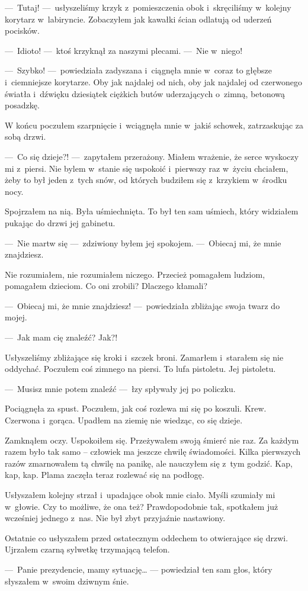 ---~Tutaj! ---~usłyszeliśmy krzyk z~pomieszczenia obok i~skręciliśmy w~kolejny korytarz w~labiryncie. Zobaczyłem jak 
kawałki ścian odlatują od uderzeń pocisków. 

---~Idioto! ---~ktoś krzyknął za naszymi plecami. ---~Nie w~niego!

---~Szybko! ---~powiedziała zadyszana i~ciągnęła mnie w~coraz to głębsze i~ciemniejsze korytarze. Oby jak najdalej od 
nich, oby jak najdalej od czerwonego światła i~dźwięku dziesiątek ciężkich butów uderzających o~zimną, betonową 
posadzkę.

W końcu poczułem szarpnięcie i~wciągnęła mnie w~jakiś schowek, zatrzaskując za sobą drzwi. 

---~Co się dzieje?! ---~zapytałem przerażony. Miałem wrażenie, że serce wyskoczy mi z~piersi. Nie bylem w~stanie się 
uspokoić i~pierwszy raz w~życiu chciałem, żeby to był jeden z~tych snów, od których budziłem się z~krzykiem w~środku 
nocy. 

Spojrzałem na nią. Była uśmiechnięta. To był ten sam uśmiech, który widziałem pukając do drzwi jej gabinetu. 

---~Nie martw się ---~zdziwiony byłem jej spokojem. ---~Obiecaj mi, że mnie znajdziesz. 

Nie rozumiałem, nie rozumiałem niczego. Przecież pomagałem ludziom, pomagałem dzieciom. Co oni zrobili? Dlaczego 
kłamali?

---~Obiecaj mi, że mnie znajdziesz! ---~powiedziała zbliżając swoja twarz do mojej. 

---~Jak mam cię znaleźć? Jak?! 

Usłyszeliśmy zbliżające się kroki i~szczek broni. Zamarłem i~starałem się nie oddychać.
Poczułem coś zimnego na piersi. To lufa pistoletu.
Jej pistoletu. 

---~Musisz mnie potem znaleźć ---~łzy spływały jej po policzku. 

Pociągnęła za spust. Poczułem, jak coś rozlewa mi się po koszuli. Krew. Czerwona i~gorąca. Upadłem na ziemię nie 
wiedząc, co się dzieje. 

Zamknąłem oczy. Uspokoiłem się. Przeżywałem swoją śmierć nie raz. Za każdym razem było tak samo – człowiek ma jeszcze 
chwilę świadomości. Kilka pierwszych razów zmarnowałem tą chwilę na panikę, ale nauczyłem się z~tym godzić. Kap, kap, 
kap. Plama zaczęła teraz rozlewać się na podłogę. 

Usłyszałem kolejny strzał i~upadające obok mnie ciało. Myśli szumiały mi w~głowie. Czy to możliwe, że ona też? 
Prawdopodobnie tak, spotkałem już wcześniej jednego z~nas. Nie był zbyt przyjaźnie nastawiony.

Ostatnie co usłyszałem przed ostatecznym oddechem to otwierające się drzwi. Ujrzałem czarną sylwetkę trzymającą 
telefon.

---~Panie prezydencie, mamy sytuację… --- powiedział ten sam głos, który słyszałem w~swoim dziwnym śnie.  

